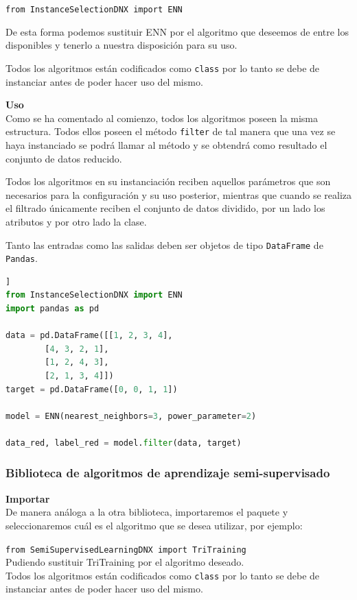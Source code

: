 \texttt{from InstanceSelectionDNX import ENN} 

De esta forma podemos sustituir ENN por el algoritmo que deseemos de entre los disponibles y tenerlo a nuestra disposición para su uso.

Todos los algoritmos están codificados como \texttt{class} por lo tanto se debe de instanciar antes de poder hacer uso del mismo. 

\textbf{Uso}\\
Como se ha comentado al comienzo, todos los algoritmos poseen la misma estructura. Todos ellos poseen el método \texttt{filter} de tal manera que una vez se haya instanciado se podrá llamar al método y se obtendrá como resultado el conjunto de datos reducido.

Todos los algoritmos en su instanciación reciben aquellos parámetros que son necesarios para la configuración y su uso posterior, mientras que cuando se realiza el filtrado únicamente reciben el conjunto de datos dividido, por un lado los atributos y por otro lado la clase.

Tanto las entradas como las salidas deben ser objetos de tipo \texttt{DataFrame} de \texttt{Pandas}.

\begin{lstlisting}[language=python, caption={Ejemplo de uso de ENN}]]
from InstanceSelectionDNX import ENN
import pandas as pd

data = pd.DataFrame([[1, 2, 3, 4],
        [4, 3, 2, 1],
        [1, 2, 4, 3],
        [2, 1, 3, 4]])
target = pd.DataFrame([0, 0, 1, 1])

model = ENN(nearest_neighbors=3, power_parameter=2)

data_red, label_red = model.filter(data, target)
\end{lstlisting}

\subsubsection{Biblioteca de algoritmos de aprendizaje semi-supervisado}
\textbf{Importar}\\
De manera análoga a la otra biblioteca, importaremos el paquete y seleccionaremos cuál es el algoritmo que se desea utilizar, por ejemplo:

\texttt{from SemiSupervisedLearningDNX import TriTraining}\\
Pudiendo sustituir TriTraining por el algoritmo deseado.\\
Todos los algoritmos están codificados como \texttt{class} por lo tanto se debe de instanciar antes de poder hacer uso del mismo. 

